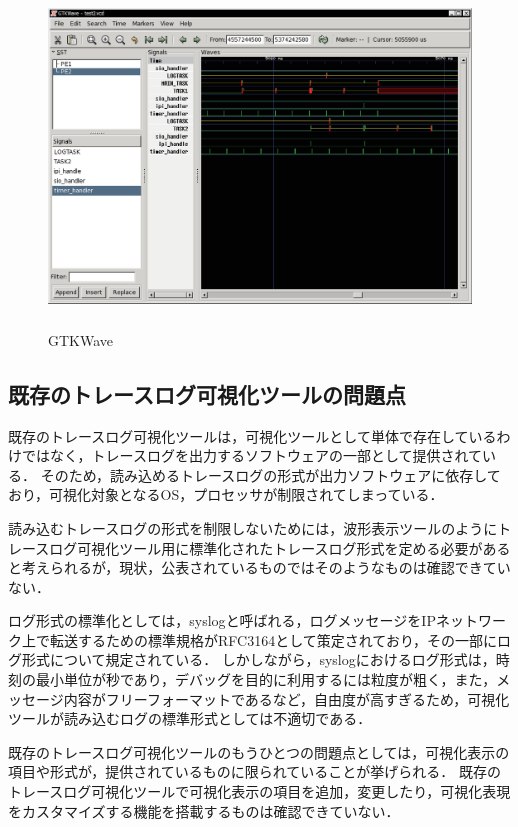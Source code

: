 \begin{figure}[t]
\begin{center}
\includegraphics[height=9cm]{img/GTKWave.eps}
\caption{GTKWave}
\label{fig:GTKWave}
\end{center}
\end{figure}

\subsection{既存のトレースログ可視化ツールの問題点}

既存のトレースログ可視化ツールは，可視化ツールとして単体で存在しているわけではなく，トレースログを出力するソフトウェアの一部として提供されている．
そのため，読み込めるトレースログの形式が出力ソフトウェアに依存しており，可視化対象となるOS，プロセッサが制限されてしまっている．

読み込むトレースログの形式を制限しないためには，波形表示ツールのようにトレースログ可視化ツール用に標準化されたトレースログ形式を定める必要があると考えられるが，現状，公表されているものではそのようなものは確認できていない．

ログ形式の標準化としては，syslog\cite{RFC3164}と呼ばれる，ログメッセージをIPネットワーク上で転送するための標準規格がRFC3164として策定されており，その一部にログ形式について規定されている．
しかしながら，syslogにおけるログ形式は，時刻の最小単位が秒であり，デバッグを目的に利用するには粒度が粗く，また，メッセージ内容がフリーフォーマットであるなど，自由度が高すぎるため，可視化ツールが読み込むログの標準形式としては不適切である．

既存のトレースログ可視化ツールのもうひとつの問題点としては，可視化表示の項目や形式が，提供されているものに限られていることが挙げられる．
既存のトレースログ可視化ツールで可視化表示の項目を追加，変更したり，可視化表現をカスタマイズする機能を搭載するものは確認できていない．

